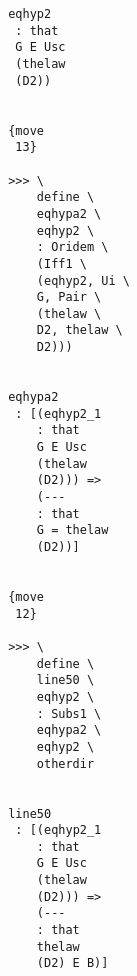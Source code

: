 \documentclass[12pt]{article}
\begin{document}
\begin{verbatim}
                                       eqhyp2 
                                        : that 
                                        G E Usc 
                                        (thelaw 
                                        (D2))


                                       {move 
                                        13}

                                       >>> \
                                           define \
                                           eqhypa2 \
                                           eqhyp2 \
                                           : Oridem \
                                           (Iff1 \
                                           (eqhyp2, Ui \
                                           G, Pair \
                                           (thelaw \
                                           D2, thelaw \
                                           D2)))


                                       eqhypa2 
                                        : [(eqhyp2_1 
                                           : that 
                                           G E Usc 
                                           (thelaw 
                                           (D2))) => 
                                           (--- 
                                           : that 
                                           G = thelaw 
                                           (D2))]


                                       {move 
                                        12}

                                       >>> \
                                           define \
                                           line50 \
                                           eqhyp2 \
                                           : Subs1 \
                                           eqhypa2 \
                                           eqhyp2 \
                                           otherdir


                                       line50 
                                        : [(eqhyp2_1 
                                           : that 
                                           G E Usc 
                                           (thelaw 
                                           (D2))) => 
                                           (--- 
                                           : that 
                                           thelaw 
                                           (D2) E B)]



\end{verbatim}
\end{document}
